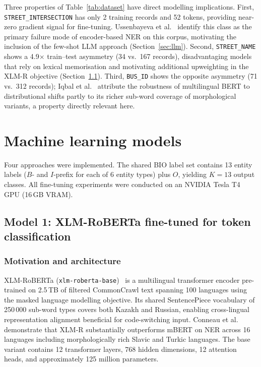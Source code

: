 Three properties of Table~\ref{tab:dataset} have direct modelling implications. First, \texttt{STREET\_INTERSECTION} has only 2 training records and 52 tokens, providing near-zero gradient signal for fine-tuning. Ussenbayeva et al.~\cite{ussenbayeva2026heterogeneous} identify this class as the primary failure mode of encoder-based NER on this corpus, motivating the inclusion of the few-shot LLM approach (Section~\ref{sec:llm}). Second, \texttt{STREET\_NAME} shows a 4.9$\times$ train--test asymmetry (34 vs.\ 167 records), disadvantaging models that rely on lexical memorisation and motivating additional upweighting in the XLM-R objective (Section~\ref{sec:xlmr}). Third, \texttt{BUS\_ID} shows the opposite asymmetry (71 vs.\ 312 records); Iqbal et al.~\cite{iqbal2024multilingual} attribute the robustness of multilingual BERT to distributional shifts partly to its richer sub-word coverage of morphological variants, a property directly relevant here.

\section{Machine learning models}
\label{sec:methods}

Four approaches were implemented. The shared BIO label set contains 13 entity labels ($B$- and $I$-prefix for each of 6 entity types) plus $O$, yielding $K = 13$ output classes. All fine-tuning experiments were conducted on an NVIDIA Tesla T4 GPU (16\,GB VRAM).

\subsection{Model 1: XLM-RoBERTa fine-tuned for token classification}
\label{sec:xlmr}

\subsubsection{Motivation and architecture}

XLM-RoBERTa (\texttt{xlm-roberta-base})~\cite{conneau2020xlmr} is a multilingual transformer encoder pre-trained on 2.5\,TB of filtered CommonCrawl text spanning 100 languages using the masked language modelling objective. Its shared SentencePiece vocabulary of 250\,000 sub-word types covers both Kazakh and Russian, enabling cross-lingual representation alignment beneficial for code-switching input. Conneau et al.~\cite{conneau2020xlmr} demonstrate that XLM-R substantially outperforms mBERT on NER across 16 languages including morphologically rich Slavic and Turkic languages. The base variant contains 12 transformer layers, 768 hidden dimensions, 12 attention heads, and approximately 125 million parameters.

